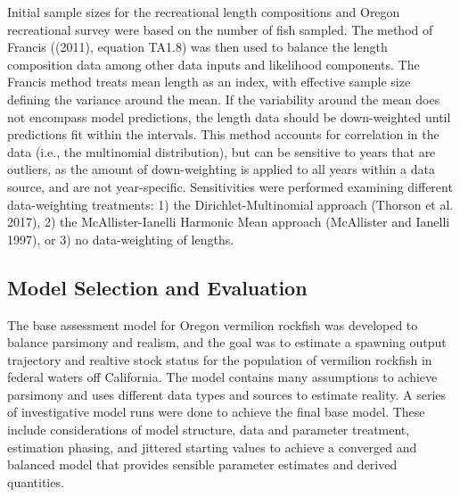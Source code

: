 \documentclass[11pt,
  english,
  a4paper,
]{article}
\begin{document}

Initial sample sizes for the recreational length compositions and Oregon recreational survey were based on the number of fish sampled. The method of Francis ({(2011)\leavevmode\tagmcend\tagstructend}, equation TA1.8) was then used to balance the length composition data among other data inputs and likelihood components. The Francis method treats mean length as an index, with effective sample size defining the variance around the mean. If the variability around the mean does not encompass model predictions, the length data should be down-weighted until predictions fit within the intervals. This method accounts for correlation in the data (i.e., the multinomial distribution), but can be sensitive to years that are outliers, as the amount of down-weighting is applied to all years within a data source, and are not year-specific. Sensitivities were performed examining different data-weighting treatments: 1) the Dirichlet-Multinomial approach {(Thorson et al. 2017)\leavevmode\tagmcend\tagstructend}, 2) the McAllister-Ianelli Harmonic Mean approach {(McAllister and Ianelli 1997)\leavevmode\tagmcend\tagstructend}, or 3) no data-weighting of lengths.

\leavevmode\tagmcend\tagstructend\par


\hypertarget{model-selection-and-evaluation}{%
\subsection{Model Selection and Evaluation}\label{model-selection-and-evaluation}}

\leavevmode\tagmcend\tagstructend


The base assessment model for Oregon vermilion rockfish was developed to balance parsimony and realism, and the goal was to estimate a spawning output trajectory and realtive stock status for the population of vermilion rockfish in federal waters off California. The model contains many assumptions to achieve parsimony and uses different data types and sources to estimate reality. A series of investigative model runs were done to achieve the final base model. These include considerations of model structure, data and parameter treatment, estimation phasing, and jittered starting values to achieve a converged and balanced model that provides sensible parameter estimates and derived quantities.
\end{document}

